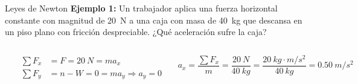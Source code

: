 \documentclass[9pt, aspectratio=169]{beamer}
\begin{document}
\begin{frame}{Leyes de Newton}
    \textbf{Ejemplo 1:} Un trabajador aplica una fuerza horizontal constante con magnitud de \qty{20}{N} a una caja con masa de \qty{40}{kg} que descansa en un piso plano con fricción despreciable. ¿Qué aceleración sufre la caja?

\begin{columns} 
\begin{center} 
    \includegraphics[width=1.0\textwidth]{figs/fig-07.png}
\end{center}
\pause 

\begin{align*}
    \sum F_x &= F = \qty{20}{N} = m a_x \\
    \sum F_y &= n - W = 0 = m a_y \Rightarrow a_y = 0
\end{align*}

\[ a_x = \frac{\sum F_x}{m} = \frac{\qty{20}{N}}{\qty{40}{kg}} = \frac{\qty{20}{kg \cdot m / s^2}}{\qty{40}{kg}} = \qty{0.50}{m/s^2} \]
\end{columns}

\end{frame}
\end{document}
